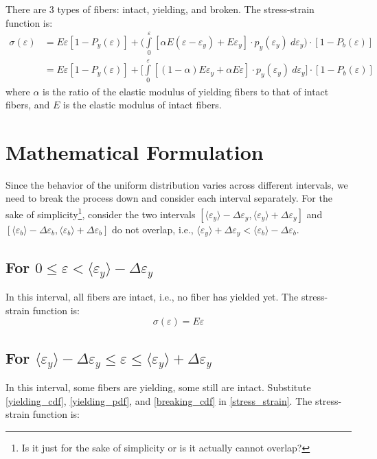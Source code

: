\documentclass{article}
\newcommand{\eps}{\varepsilon}
\newcommand{\avg}[1]{\langle #1 \rangle}
\newcommand{\dey}{\Delta \varepsilon_y}
\newcommand{\deb}{\Delta \varepsilon_b}
\begin{document}
There are 3 types of fibers: intact, yielding, and broken. The stress-strain function is:
\begin{align}
    \sigma(\eps) &= E \eps [1 - P_y(\eps)] + \bigg(\int\limits_0^\eps [\alpha E (\eps - \eps_y) + E \eps_y] \cdot p_y(\eps_y) ~ d\eps_y \bigg)\cdot [1 - P_b(\eps)] \\
    &= E \eps [ 1 - P_y(\eps) ] + \Bigg[\int\limits_0^\eps [(1 - \alpha) E \eps_y + \alpha E \eps] \cdot p_y(\eps_y) ~ d\eps_y \Bigg]\cdot [1 - P_b(\eps)]
\label{stress_strain}
\end{align}
where $\alpha$ is the ratio of the elastic modulus of yielding fibers to that of intact fibers, and $E$ is the elastic modulus of intact fibers.


\section{Mathematical Formulation}

Since the behavior of the uniform distribution varies across different intervals, we need to break the process down and consider each interval separately. For the sake of simplicity\footnote{Is it just for the sake of simplicity or is it actually cannot overlap?}, consider the two intervals $[\avg{\eps_y} - \dey, \avg{\eps_y} + \dey]$ and $[\avg{\eps_b} - \deb, \avg{\eps_b} + \deb]$ do not overlap, i.e., $\avg{\eps_y} + \dey < \avg{\eps_b} - \deb$.


\subsection{For $0 \leq \eps < \avg{\eps_y} - \dey$}

\indent 
In this interval, all fibers are intact, i.e., no fiber has yielded yet. The stress-strain function is:
\begin{equation}
    \sigma(\eps) = E \eps
\end{equation}
\subsection{For $\avg{\eps_y} - \dey \leq \eps \leq \avg{\eps_y} + \dey$}
In this interval, some fibers are yielding, some still are intact. Substitute \eqref{yielding_cdf}, \eqref{yielding_pdf}, and \eqref{breaking_cdf} in \eqref{stress_strain}. The stress-strain function is:
\end{document}
